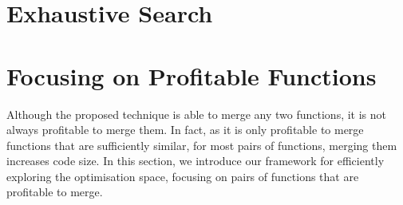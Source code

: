 \section{Exhaustive Search}


\section{Focusing on Profitable Functions}
\label{sec:framework}


Although the proposed technique is able to merge any two functions, it is not always profitable to merge them. In fact, as it is only
profitable to merge functions that are sufficiently similar, for most pairs of functions, merging them increases code size.
In this section, we introduce our framework for efficiently exploring the
optimisation space, focusing on pairs of functions that are profitable to merge. 



